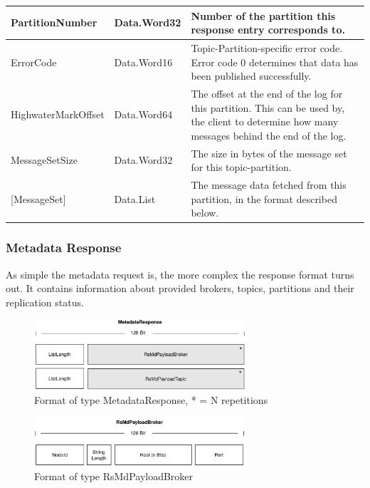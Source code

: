 \begin{table}[H]
\centering
\begin{tabular}{ l  l  p{10cm} }
\hline
PartitionNumber     & Data.Word32 & Number of the partition this response entry corresponds to.                                                                                               \\ \hline
ErrorCode           & Data.Word16 & Topic-Partition-specific error code. Error code 0 determines that data has been published successfully.                                                \\ \hline
HighwaterMarkOffset & Data.Word64 & The offset at the end of the log for this partition. This can be used by, the client to determine how many messages behind the end of the log. \\ \hline
MessageSetSize      & Data.Word32 & The size in bytes of the message set for this topic-partition.                                                                                         \\ \hline
{[}MessageSet{]}    & Data.List   & The message data fetched from this partition, in the format described below.                                                                           \\ \hline
\end{tabular}
\end{table}

\subsubsection{Metadata Response}
As simple the metadata request is, the more complex the response format turns
out. It contains information about provided brokers, topics, partitions and
their replication status. 

\begin{figure}[H]
    \centering
    \includegraphics[width=0.7\textwidth]{images/impl-prot-types-metadataResponse.png}
    \caption{Format of type MetadataResponse, * = N repetitions}
\end{figure}

\begin{figure}[H]
    \centering
    \includegraphics[width=0.7\textwidth]{images/impl-prot-types-mdPayloadBroker.png}
    \caption{Format of type RsMdPayloadBroker} 
\end{figure}

